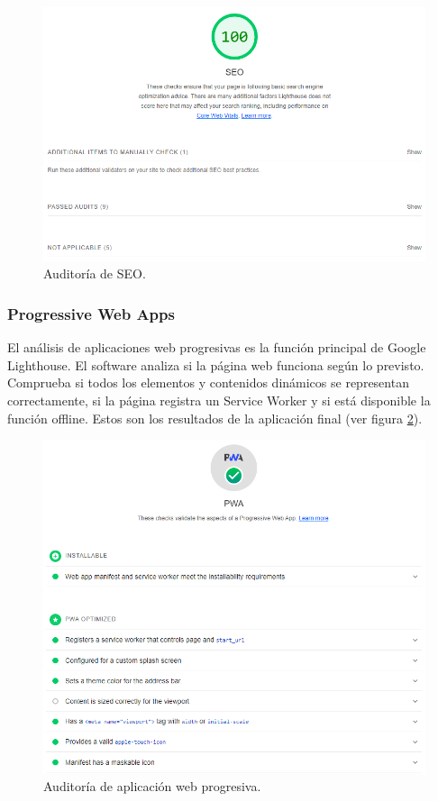 \documentclass[12pt,twoside,titlepage]{report}
\begin{document}
{\begin{figure}[H]
    \centering
    \includegraphics[scale=0.6]{Lighthouse/SEO}
    \caption{Auditoría de SEO.}
    \label{fig:Lighthouse_seo}
\end{figure}

\subsubsection{Progressive Web Apps}

El análisis de aplicaciones web progresivas es la función principal de Google Lighthouse. El software analiza si la página web funciona según lo previsto. Comprueba si todos los elementos y contenidos dinámicos se representan correctamente, si la página registra un Service Worker y si está disponible la función offline. Estos son los resultados de la aplicación final (ver figura \ref{fig:Lighthouse_PWA}).

\begin{figure}[H]
    \centering
    \includegraphics[scale=0.6]{Lighthouse/PWA}
    \caption{Auditoría de aplicación web progresiva.}
    \label{fig:Lighthouse_PWA}
\end{figure}

}
\end{document}
